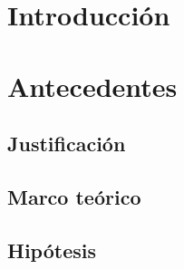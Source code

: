 \documentclass[12pt]{article}
\begin{document}
\newpage








\section{Introducción}





\section{Antecedentes}



\subsection{Justificación}





\subsection{Marco teórico}





\subsection{Hipótesis}
\end{document}
